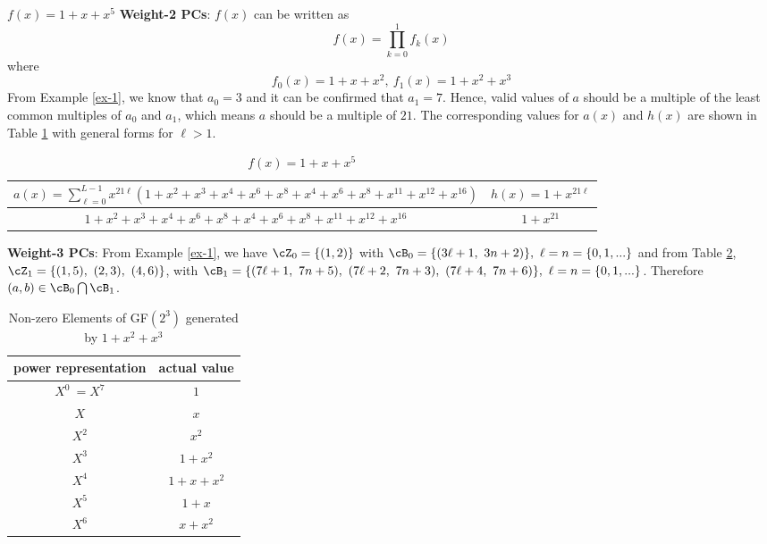 \begin{example}
$f(x)=1+x+x^5$\newline
\textbf{Weight-2 PCs}: $f(x)$ can be written as 
$$f(x)=\prod_{k=0}^{1}f_k(x)$$
where 
$$f_0(x)=1+x+x^2,~f_1(x)=1+x^2+x^3$$ 
From Example \ref{ex-1}, we know that $a_0=3$ and it can be confirmed that $a_1=7$.
Hence, valid values of $a$ should be a multiple of the least common multiples of $a_0$ and $a_1$, which means $a$ should be a multiple of $21$.
The corresponding values for $a(x)$ and $h(x)$ are shown in Table \ref{novelTab1-c} with general forms for $\ell>1$.

\begin{table}[htbp]
\renewcommand{\arraystretch}{1.3}
 \caption{$f(x)=1+x+x^5$}
 \centering
\begin{tabular}{c c } 
\hline
 $a(x)=\sum_{\ell=0}^{L-1} x^{21\ell}(1+x^2+x^3+x^4+x^6+x^8+x^{4}+x^{6}+x^{8}+x^{11}+x^{12}+x^{16})$ & $h(x)=1+x^{21\ell}$ \\ [0.5ex] 
\hline\hline
$1+x^2+x^3+x^4+x^6+x^8+x^{4}+x^{6}+x^{8}+x^{11}+x^{12}+x^{16}$ & $1+x^{21}$\\ 
\end{tabular}
 \label{novelTab1-c}
\end{table}

\textbf{Weight-3 PCs}:
From Example \ref{ex-1}, we have $\cZ_0=\{ (1,2)\}$ with $\cB_0=\{( 3\ell+1,~3n+2)\},~\ell=n=\{0,1,...\}$ and from Table \ref{novelTabWt3-5}, $ \cZ_1=\{(1,5),~(2,3),~(4,6)\}$, with $ \cB_1=\{(7\ell+1,~7n+5),~(7\ell+2,~7n+3),~(7\ell+4,~7n+6) \},~\ell=n=\{0,1,...\}$. Therefore $(a,b) \in \cB_0 \bigcap \cB_1$.

\begin{table}[htbp]
 \caption{Non-zero Elements of GF$(2^3)$ generated by $1+x^2+x^3$}
\centering
 \begin{tabular}{c c} 
 \hline
 power representation & actual value \\ [0.5ex] 
 \hline\hline
$X^0~=X^7$ & $1$\\
\hline
$X$ & $x$\\
\hline
$X^2$ &  $x^2$\\
\hline
$X^3$ &  $1+x^2$\\
\hline
$X^4$ &  $1+x+x^2$\\
\hline
$X^5$ &  $1+x$\\
\hline
$X^6$ &  $x+x^2$\\
\hline
 \end{tabular}
 \label{novelTabWt3-5}
\end{table}


\end{example}
